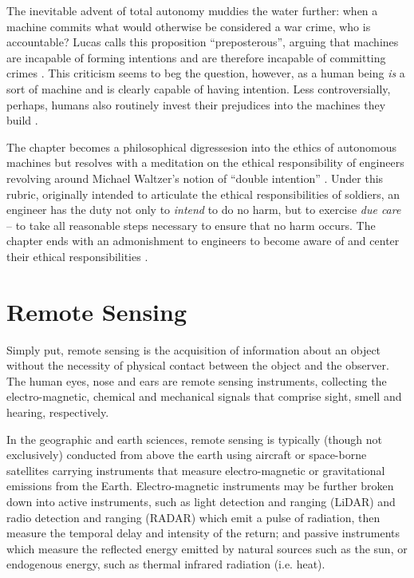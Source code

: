 \documentclass[10pt]{article}
\begin{document}
The inevitable advent of total autonomy muddies the water further: when a machine commits what would otherwise be considered a war crime, who is accountable? Lucas calls this proposition ``preposterous'', arguing that machines are incapable of forming intentions and are therefore incapable of committing crimes \cite[p.2868]{Valavanis2015bz}. This criticism seems to beg the question, however, as a human being \emph{is} a sort of machine and is clearly capable of having intention. Less controversially, perhaps, humans also routinely invest their prejudices into the machines they build \cite{Greenwald1998,Caliskan2017}. 

The chapter becomes a philosophical digressesion into the ethics of autonomous machines but resolves with a meditation on the ethical responsibility of engineers \cite[p.2873]{Valavanis2015bz} revolving around Michael Waltzer's notion of ``double intention'' \cite{Waltzer}. Under this rubric, originally intended to articulate the ethical responsibilities of soldiers, an engineer has the duty not only to \emph{intend} to do no harm, but to exercise \emph{due care} \cite{Lucas2011} -- to take all reasonable steps necessary to ensure that no harm occurs. The chapter ends with an admonishment to engineers to become aware of and center their ethical responsibilities \cite[p.2974]{Valavanis2015bz}.

\section{Remote Sensing}

Simply put, remote sensing is the acquisition of information about an object without the necessity of physical contact between the object and the observer. The human eyes, nose and ears are remote sensing instruments, collecting the electro-magnetic, chemical and mechanical signals that comprise sight, smell and hearing, respectively.

In the geographic and earth sciences, remote sensing is typically (though not exclusively) conducted from above the earth using aircraft or space-borne satellites carrying instruments that measure electro-magnetic or gravitational emissions from the Earth. Electro-magnetic instruments may be further broken down into active instruments, such as light detection and ranging (LiDAR) and radio detection and ranging (RADAR) which emit a pulse of radiation, then measure the temporal delay and intensity of the return; and passive instruments which measure the reflected energy emitted by natural sources such as the sun, or endogenous energy, such as thermal infrared radiation (i.e. heat).
\end{document}
